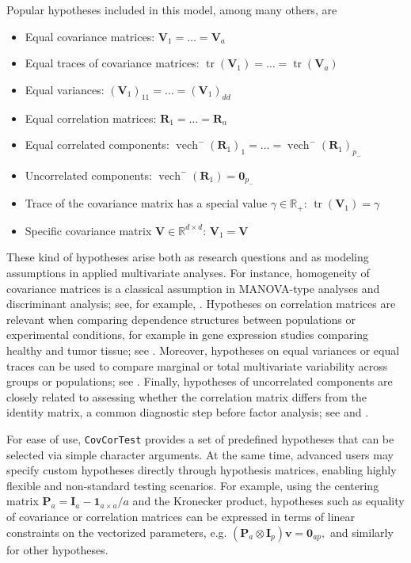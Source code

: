 Popular hypotheses included in this model, among many others, are

\begin{itemize}
\item
  Equal covariance matrices:
  \(\boldsymbol{V}_1 = \dots = \boldsymbol{V}_a\)
\item
  Equal traces of covariance matrices:
  \(\operatorname{tr}(\boldsymbol{V}_1) = \dots = \operatorname{tr}(\boldsymbol{V}_a)\)
\item
  Equal variances:
  \((\boldsymbol{V}_1)_{11} = \dots = (\boldsymbol{V}_1)_{dd}\)
\item
  Equal correlation matrices:
  \(\boldsymbol{R}_1 = \dots = \boldsymbol{R}_a\)
\item
  Equal correlated components:
  \(\operatorname{vech}^{-}(\boldsymbol{R}_1)_1 = \dots = \operatorname{vech}^{-}(\boldsymbol{R}_1)_{p_-}\)
\item
  Uncorrelated components:
  \(\operatorname{vech}^{-}(\boldsymbol{R}_1) = \mathbf{0}_{p_-}\)
\item
  Trace of the covariance matrix has a special value
  \(\gamma \in \mathbb{R}_+\):
  \(\operatorname{tr}(\boldsymbol{V}_1) = \gamma\)
\item
  Specific covariance matrix
  \(\boldsymbol{V} \in \mathbb{R}^{d \times d}\):
  \(\boldsymbol{V}_1 = \boldsymbol{V}\)
\end{itemize}

These kind of hypotheses arise both as research questions and as modeling assumptions in applied multivariate analyses. For instance, homogeneity of covariance matrices is a classical assumption in MANOVA-type analyses and discriminant analysis; see, for example, \citet{FriendlySigal2020}. Hypotheses on correlation matrices are relevant when comparing dependence structures between populations or experimental conditions, for example in gene expression studies comparing healthy and tumor tissue; see \citet{CaballeEtAl2018}. Moreover, hypotheses on equal variances or equal traces can be used to compare marginal or total multivariate variability across groups or populations; see \citet{LeMaitreMitteroecker2019}. Finally, hypotheses of uncorrelated components are closely related to assessing whether the correlation matrix differs from the identity matrix, a common diagnostic step before factor analysis; see \citet{Bartlett1951} and \citet{Revelle2019}.

For ease of use, \texttt{CovCorTest} provides a set of predefined hypotheses that
can be selected via simple character arguments. At the same time, advanced
users may specify custom hypotheses directly through hypothesis matrices,
enabling highly flexible and non-standard testing scenarios. For example, using the centering matrix
\(\boldsymbol{P}_a = \boldsymbol{I}_a - \mathbf{1}_{a \times a} / a\) and the Kronecker product, hypotheses
such as equality of covariance or correlation matrices can be expressed in terms
of linear constraints on the vectorized parameters, e.g.
\((\boldsymbol{P}_a \otimes \boldsymbol{I}_p)\boldsymbol{v} = \mathbf{0}_{ap},\)
and similarly for other hypotheses.

